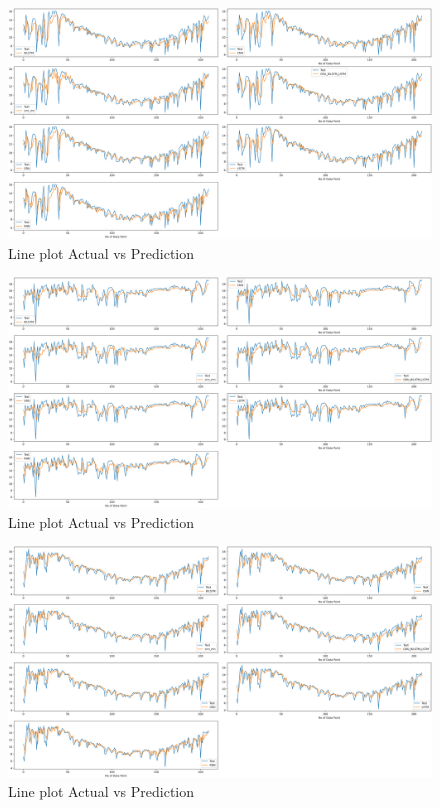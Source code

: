 \documentclass[a4paper,fleqn]{cas-sc}
\begin{document}
      
      
      \begin{figure}[!ht]
      \centering
      \includegraphics[width=\textwidth]{Jodhpur (2)_act vs pred}
      \caption{Line plot Actual vs Prediction}
      \label{Line plot8}
      \end{figure}
      
      
      \begin{figure}[!ht]
      \centering
      \includegraphics[width=\textwidth]{new delhi_act vs pred}
      \caption{Line plot Actual vs Prediction}
      \label{Line plot9}
      \end{figure}
      
      
      \begin{figure}[!ht]
      \centering
      \includegraphics[width=\textwidth]{Pokhran_act vs pred (1)}
      \caption{Line plot Actual vs Prediction}
      \label{fig:plot}
      \end{figure}
      
\end{document}
